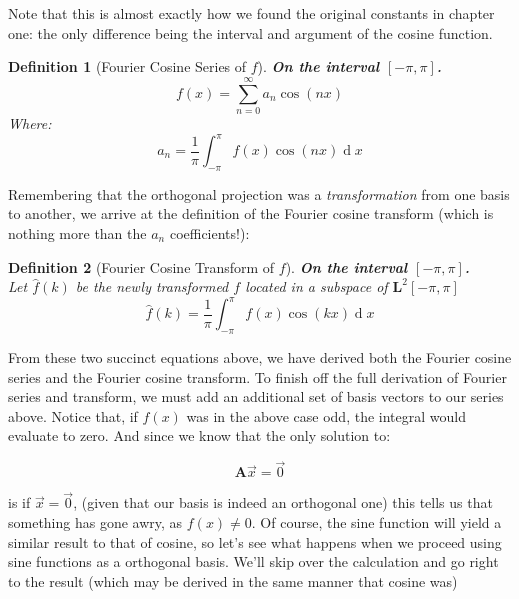 \documentclass[12pt,a4paper]{report}
\DeclareMathOperator{\deriv}{d}
\theoremstyle{thms}
\theoremstyle{defns}
\newtheorem{definition}{Definition}[section]
\begin{document}
Note that this is almost exactly how we found the original constants in chapter one: the only difference being the interval and argument of the cosine function.

\begin{definition}[Fourier Cosine Series of $f$]
    \textbf{On the interval $[-\pi, \pi]$.}\\
    \begin{equation}
        f(x) = \sum_{n=0}^{\infty}a_n\cos(nx)
    \end{equation}
    Where:
    \begin{equation}
        a_n = \dfrac{1}{\pi}\int_{-\pi}^{\pi} f(x)\cos(nx)\deriv{x}
    \end{equation}
\end{definition}

Remembering that the orthogonal projection was a \textit{transformation} from one basis to another, we arrive at the definition of the Fourier cosine transform (which is nothing more than the $a_n$ coefficients!):

\begin{definition}[Fourier Cosine Transform of $f$]
    \textbf{On the interval $[-\pi, \pi]$.}\\
    Let $\hat{f}(k)$ be the newly transformed $f$ located in a subspace of $\mathbf{L}^2[-\pi, \pi]$
    \begin{equation}
        \hat{f}(k) = \dfrac{1}{\pi}\int_{-\pi}^{\pi} f(x)\cos(kx)\deriv{x}
    \end{equation}
\end{definition}

From these two succinct equations above, we have derived both the Fourier cosine series and the Fourier cosine transform. To finish off the full derivation of Fourier series and transform, we must add an additional set of basis vectors to our series above. Notice that, if $f(x)$ was in the above case odd, the integral would evaluate to zero. And since we know that the only solution to:

\begin{equation}
    \mathbf{A}\vec{x} = \vec{0}
\end{equation}

is if $\vec{x} = \vec{0}$, (given that our basis is indeed an orthogonal one) this tells us that something has gone awry, as $f(x) \neq 0$. Of course, the sine function will yield a similar result to that of cosine, so let's see what happens when we proceed using sine functions as a orthogonal basis. We'll skip over the calculation and go right to the result (which may be derived in the same manner that cosine was)
\end{document}
